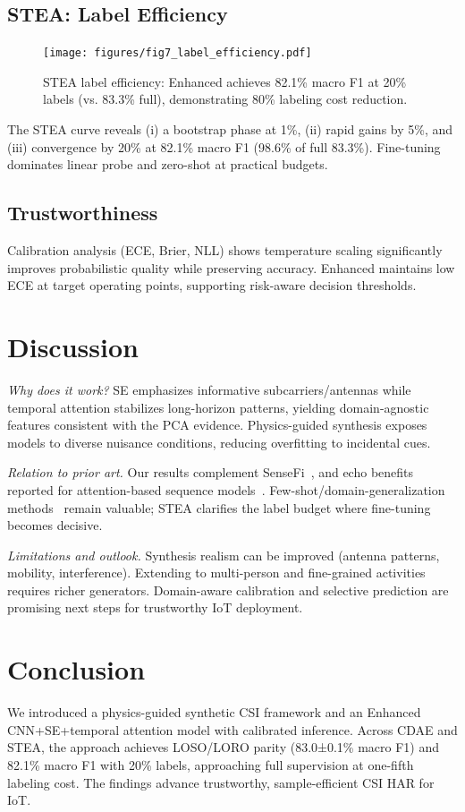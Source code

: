 \documentclass[journal]{IEEEtran}
\begin{document}
\subsection{STEA: Label Efficiency}
\begin{figure}[t]
\centering
\texttt{[image: figures/fig7\_label\_efficiency.pdf]}
\caption{STEA label efficiency: Enhanced achieves 82.1\% macro F1 at 20\% labels (vs. 83.3\% full), demonstrating 80\% labeling cost reduction.}
\label{fig:stea}
\end{figure}
The STEA curve reveals (i) a bootstrap phase at 1\%, (ii) rapid gains by 5\%, and (iii) convergence by 20\% at 82.1\% macro F1 (98.6\% of full 83.3\%). Fine-tuning dominates linear probe and zero-shot at practical budgets.

\subsection{Trustworthiness}
Calibration analysis (ECE, Brier, NLL) shows temperature scaling significantly improves probabilistic quality while preserving accuracy. Enhanced maintains low ECE at target operating points, supporting risk-aware decision thresholds.

\section{Discussion}
\textit{Why does it work?} SE emphasizes informative subcarriers/antennas while temporal attention stabilizes long-horizon patterns, yielding domain-agnostic features consistent with the PCA evidence. Physics-guided synthesis exposes models to diverse nuisance conditions, reducing overfitting to incidental cues.

\textit{Relation to prior art.} Our results complement SenseFi~\cite{yang2023sensefi}, and echo benefits reported for attention-based sequence models~\cite{li2020tea,bertasius2021timesformer,lim2021tft,zhou2021informer}. Few-shot/domain-generalization methods~\cite{fewsense2022,airfi2022} remain valuable; STEA clarifies the label budget where fine-tuning becomes decisive.

\textit{Limitations and outlook.} Synthesis realism can be improved (antenna patterns, mobility, interference). Extending to multi-person and fine-grained activities requires richer generators. Domain-aware calibration and selective prediction are promising next steps for trustworthy IoT deployment.

\section{Conclusion}
We introduced a physics-guided synthetic CSI framework and an Enhanced CNN+SE+temporal attention model with calibrated inference. Across CDAE and STEA, the approach achieves LOSO/LORO parity (83.0±0.1\% macro F1) and 82.1\% macro F1 with 20\% labels, approaching full supervision at one-fifth labeling cost. The findings advance trustworthy, sample-efficient CSI HAR for IoT.
\end{document}
